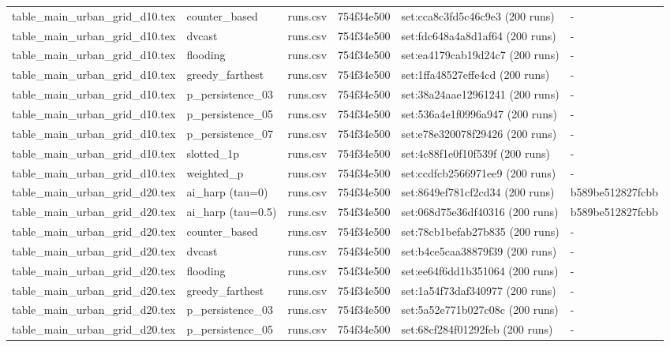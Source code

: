 \begin{tabular}{llllll}
table\_main\_urban\_grid\_d10.tex & counter\_based & runs.csv & 754f34e500 & set:cca8c3fd5c46c9e3 (200 runs) & - \\
table\_main\_urban\_grid\_d10.tex & dvcast & runs.csv & 754f34e500 & set:fdc648a4a8d1af64 (200 runs) & - \\
table\_main\_urban\_grid\_d10.tex & flooding & runs.csv & 754f34e500 & set:ea4179cab19d24c7 (200 runs) & - \\
table\_main\_urban\_grid\_d10.tex & greedy\_farthest & runs.csv & 754f34e500 & set:1ffa48527effe4cd (200 runs) & - \\
table\_main\_urban\_grid\_d10.tex & p\_persistence\_03 & runs.csv & 754f34e500 & set:38a24aae12961241 (200 runs) & - \\
table\_main\_urban\_grid\_d10.tex & p\_persistence\_05 & runs.csv & 754f34e500 & set:536a4e1f0996a947 (200 runs) & - \\
table\_main\_urban\_grid\_d10.tex & p\_persistence\_07 & runs.csv & 754f34e500 & set:e78e320078f29426 (200 runs) & - \\
table\_main\_urban\_grid\_d10.tex & slotted\_1p & runs.csv & 754f34e500 & set:4c88f1e0f10f539f (200 runs) & - \\
table\_main\_urban\_grid\_d10.tex & weighted\_p & runs.csv & 754f34e500 & set:ccdfcb2566971ee9 (200 runs) & - \\
table\_main\_urban\_grid\_d20.tex & ai\_harp (tau=0) & runs.csv & 754f34e500 & set:8649ef781cf2cd34 (200 runs) & b589be512827fcbb \\
table\_main\_urban\_grid\_d20.tex & ai\_harp (tau=0.5) & runs.csv & 754f34e500 & set:068d75e36df40316 (200 runs) & b589be512827fcbb \\
table\_main\_urban\_grid\_d20.tex & counter\_based & runs.csv & 754f34e500 & set:78cb1befab27b835 (200 runs) & - \\
table\_main\_urban\_grid\_d20.tex & dvcast & runs.csv & 754f34e500 & set:b4ce5caa38879f39 (200 runs) & - \\
table\_main\_urban\_grid\_d20.tex & flooding & runs.csv & 754f34e500 & set:ee64f6dd1b351064 (200 runs) & - \\
table\_main\_urban\_grid\_d20.tex & greedy\_farthest & runs.csv & 754f34e500 & set:1a54f73daf340977 (200 runs) & - \\
table\_main\_urban\_grid\_d20.tex & p\_persistence\_03 & runs.csv & 754f34e500 & set:5a52e771b027c08c (200 runs) & - \\
table\_main\_urban\_grid\_d20.tex & p\_persistence\_05 & runs.csv & 754f34e500 & set:68cf284f01292feb (200 runs) & - \\

\end{tabular}
